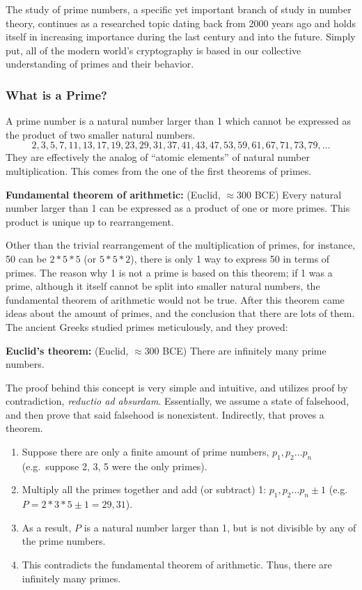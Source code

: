 
The study of prime numbers, a specific yet important branch of study in number theory, continues as a researched topic dating back from 2000 years ago and holds itself in increasing importance during the last century and into the future. Simply put, all of the modern world’s cryptography is based in our collective understanding of primes and their behavior. 

\subsubsection*{What is a Prime?}

A prime number is a natural number larger than 1 which cannot be expressed as the product of two smaller natural numbers. 
\[2, 3, 5, 7, 11, 13, 17, 19, 23, 29, 31, 37, 41, 43, 47, 53, 59 ,61, 67, 71, 73, 79, \ldots \]
They are effectively the analog of “atomic elements” of natural number multiplication. This comes from the one of the first theorems of primes.

\textbf{Fundamental theorem of arithmetic:}  (Euclid, \(\approx 300\) BCE) Every natural number larger than 1 can be expressed as a product of one or more primes. This product is unique up to rearrangement.

Other than the trivial rearrangement of the multiplication of primes, for instance, 50 can be \(2 * 5 * 5\) (or \(5 * 5 * 2\)), there is only 1 way to express 50 in terms of primes. The reason why 1 is not a prime is based on this theorem; if 1 was a prime, although it itself cannot be split into smaller natural numbers, the fundamental theorem of arithmetic would not be true. After this theorem came ideas about the amount of primes, and the conclusion that there are lots of them. The ancient Greeks studied primes meticulously, and they proved:

\textbf{Euclid’s theorem:} (Euclid, \(\approx 300\) BCE) There are infinitely many prime numbers.

The proof behind this concept is very simple and intuitive, and utilizes proof by contradiction, \textit{reductio ad absurdam}. Essentially, we assume a state of falsehood, and then prove that said falsehood is nonexistent. Indirectly, that proves a theorem. 

\begin{enumerate}
    \item Suppose there are only a finite amount of prime numbers, \(p_1, p_2 \ldots p_n\) (e.g.\ suppose 2, 3, 5 were the only primes).
    \item Multiply all the primes together and add (or subtract) 1: \(p_1, p_2 \ldots p_n \pm 1\) (e.g. \(P = 2 * 3 * 5 \pm 1 = 29, 31\)).
    \item As a result, \(P\) is a natural number larger than 1, but is not divisible by any of the prime numbers.
    \item This contradicts the fundamental theorem of arithmetic. Thus, there are infinitely many primes.
\end{enumerate}

